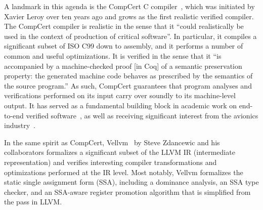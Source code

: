 A landmark in this agenda is the CompCert C compiler~\cite{compcert}, which was initiated by Xavier
Leroy over ten years ago and grows as the first realistic verified compiler.  The CompCert compiler
is realistic in the sense that it ``could realistically be used in the context of production of
critical software''.  In particular, it compiles a significant subset of ISO C99 down to assembly,
and it performs a number of common and useful optimizations.  It is verified in the sense that it
``is accompanied by a machine-checked proof [in Coq] of a semantic preservation property: the
generated machine code behaves as prescribed by the semantics of the source program.''  As such,
CompCert guarantees that program analyses and verifications performed on its input carry over
soundly to its machine-level output.  It has served as a fundamental building block in academic work
on end-to-end verified software~\cite{TODO}, as well as receiving significant interest from the
avionics industry~\cite{TODO}. 


In the same spirit as CompCert, Vellvm~\cite{vellvm} by Steve Zdancewic and his collaborators
formalizes a significant subset of the LLVM IR (intermediate representation) and verifies
interesting compiler transformations and optimizations performed at the IR level.  Most notably,
Vellvm formalizes the static single assignment form (SSA), including a dominance analysis, an SSA
type checker, and an SSA-aware register promotion algorithm that is simplified from the
 pass in LLVM.

